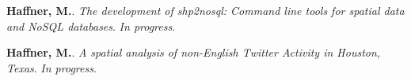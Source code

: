 \begin{cventries}
   \cventry
      {}
      {}
      {}
      {}
      {
        \begin{cvitems}
          \vspace{-4mm}
        \item {\textbf{Haffner, M.}.
            \textit{The development of shp2nosql: Command line tools for spatial data and NoSQL databases}. \textit{In progress}.} \\
          \vspace{-2mm}
        \item
          {\textbf{Haffner, M.}.
            \textit{A spatial analysis of non-English Twitter Activity in Houston, Texas}. \textit{In progress}.} \\
        \end{cvitems}
    }
\end{cventries}
